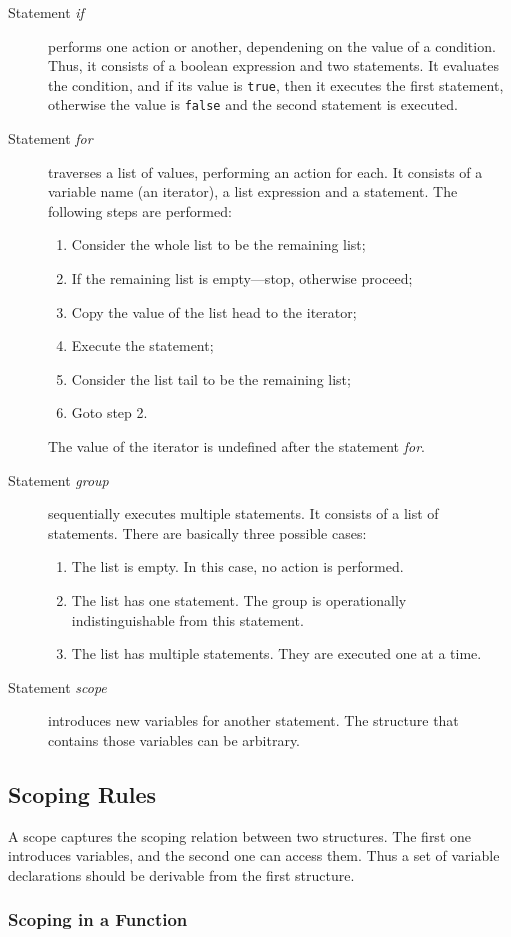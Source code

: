 \documentclass [a4paper] {article}
\begin{document}
\begin {description}
\item [Statement \emph{if}] performs one action or another, dependening on the
value of a condition. Thus, it consists of a boolean expression and two
statements. It evaluates the condition, and if its value is \texttt{true}, then
it executes the first statement, otherwise the value is \texttt{false} and the
second statement is executed.

\item [Statement \emph{for}] traverses a list of values, performing an action
for each. It consists of a variable name (an iterator), a list expression and a
statement. The following steps are performed:
\begin {enumerate}
\item Consider the whole list to be the remaining list;
\item If the remaining list is empty---stop, otherwise proceed;
\item Copy the value of the list head to the iterator;
\item Execute the statement;
\item Consider the list tail to be the remaining list;
\item Goto step 2.
\end {enumerate}
The value of the iterator is undefined after the statement \emph{for}.

\item [Statement \emph{group}] sequentially executes multiple statements. It
consists of a list of statements. There are basically three possible cases:
\begin {enumerate}
\item The list is empty. In this case, no action is performed.
\item The list has one statement. The group is operationally indistinguishable
from this statement.
\item The list has multiple statements. They are executed one at a time.
\end {enumerate}

\item [Statement \emph{scope}] introduces new variables for another statement.
The structure that contains those variables can be arbitrary.

\end {description}

\subsection { Scoping Rules }

A scope captures the scoping relation between two structures. The first one
introduces variables, and the second one can access them. Thus a set of variable
declarations should be derivable from the first structure.

\subsubsection { Scoping in a Function }
\end{document}
